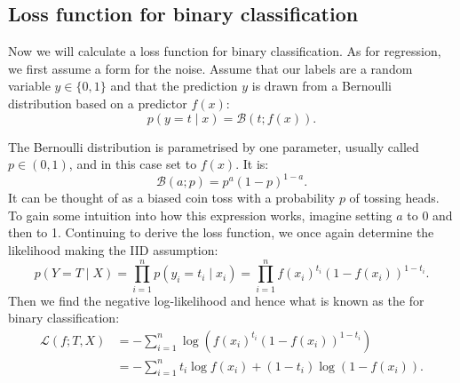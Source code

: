         \subsection{Loss function for binary classification}
        \label{sec:loss-classification}

            Now we will calculate a loss function for binary classification. As for regression, we first assume a form for the noise. Assume that our labels are a random variable $y \in \{0, 1\}$ and that the prediction $y$ is drawn from a Bernoulli distribution based on a predictor $f(x)$:
            \begin{equation}
                p(y = t \mid x) = \mathcal B(t; f(x)).
            \end{equation}

            The Bernoulli distribution is parametrised by one parameter, usually called $p \in (0, 1)$, and in this case set to $f(x)$. It is:
            \begin{equation}
                \mathcal B(a; p) = p^a(1 - p)^{1 - a}.
            \end{equation}
            It can be thought of as a biased coin toss with a probability $p$ of tossing heads. To gain some intuition into how this expression works, imagine setting $a$ to 0 and then to 1. Continuing to derive the loss function, we once again determine the likelihood making the IID assumption:
            \begin{equation}
                p(Y = T \mid X) = \prod_{i = 1}^n p(y_i = t_i \mid x_i) = \prod_{i = 1}^n f(x_i)^{t_i}(1 - f(x_i))^{1 - {t_i}}.
            \end{equation}
            Then we find the negative log-likelihood and hence what is known as the  for binary classification:
            \begin{align}
                \mathcal L(f; T, X) &= -\sum_{i = 1}^n \log \left(f(x_i)^{t_i}(1 - f(x_i))^{1 - {t_i}}\right)\\
                    &= -\sum_{i = 1}^n t_i \log f(x_i) + (1 - t_i) \log (1 - f(x_i)).
            \end{align}


